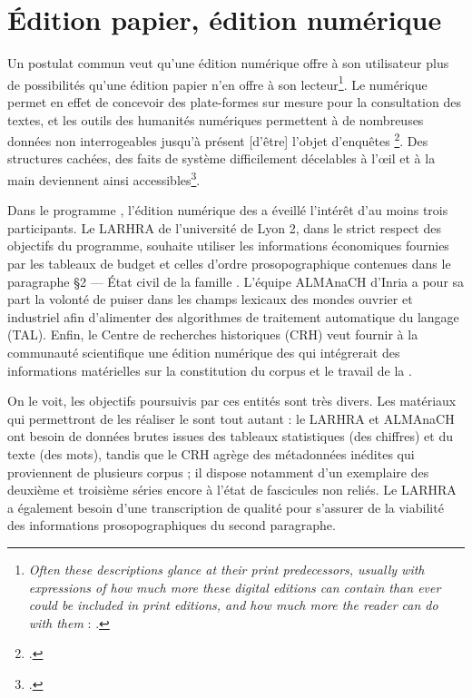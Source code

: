 \section{Édition papier, édition numérique}

Un postulat commun veut qu'une édition numérique offre à son utilisateur plus de possibilités qu'une édition papier n'en offre à son lecteur\footnote{\og \textit{Often these descriptions glance at their print predecessors, usually with expressions of how much more these digital editions can contain than ever could be included in print editions, and how much more the reader can do with them} \fg{} : \cite[p. 105-106]{robinson}.}. Le numérique permet en effet de concevoir des plate-formes sur mesure pour la consultation des textes, et les outils des humanités numériques permettent à \og de nombreuses données non interrogeables jusqu’à présent [d'être] l’objet d’enquêtes \fg\footcite[p. 20]{duval}. \og Des structures cachées, des faits de système difficilement décelables à l’œil et à la main \fg{} deviennent ainsi accessibles\footcite{duval}.

Dans le programme \timeus{}, l'édition numérique des \odm{} a éveillé l'intérêt d'au moins trois participants. Le LARHRA de l'université de Lyon 2, dans le strict respect des objectifs du programme, souhaite utiliser les informations économiques fournies par les tableaux de budget et celles d'ordre prosopographique contenues dans le paragraphe \og §2 --- État civil de la famille \fg. L'équipe ALMAnaCH d'Inria a pour sa part la volonté de puiser dans les champs lexicaux des mondes ouvrier et industriel afin d'alimenter des algorithmes de traitement automatique du langage (TAL). Enfin, le Centre de recherches historiques (CRH) veut fournir à la communauté scientifique une édition numérique des \odm{} qui intégrerait des informations matérielles sur la constitution du corpus et le travail de la \sess.

On le voit, les objectifs poursuivis par ces entités sont très divers. Les matériaux qui permettront de les réaliser le sont tout autant : le LARHRA et ALMAnaCH ont besoin de données brutes issues des tableaux statistiques (des chiffres) et du texte (des mots), tandis que le CRH agrège des métadonnées inédites qui proviennent de plusieurs corpus ; il dispose notamment d'un exemplaire des deuxième et troisième séries encore à l'état de fascicules non reliés. Le LARHRA a également besoin d'une transcription de qualité pour s'assurer de la viabilité des informations prosopographiques du second paragraphe.

